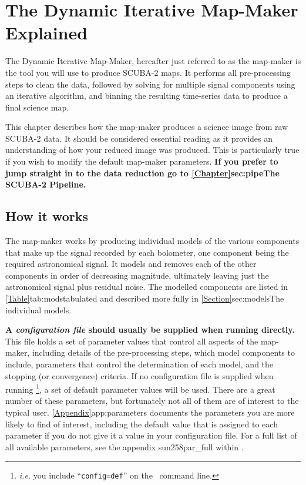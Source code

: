 \chapter{The Dynamic Iterative Map-Maker Explained}
\label{sec:dimm}

The Dynamic Iterative Map-Maker, hereafter just referred to as the
map-maker is the tool you will use to produce SCUBA-2 maps. It performs
all pre-processing steps to clean the data, followed by solving for
multiple signal components using an iterative algorithm, and binning
the resulting time-series data to produce a final science map.

This chapter describes how the map-maker produces a science image
from raw SCUBA-2 data. It should be considered essential reading as it
provides an understanding of how your reduced image was produced. This is
particularly true if you wish to modify the default map-maker parameters.
\color{red}\textbf{ If you prefer to jump straight in to the data reduction go
to \cref{Chapter}{sec:pipe}{The SCUBA-2 Pipeline}.}\color{black}


\section{How it works}

The map-maker works by producing individual models of the various
components that make up the signal recorded by each bolometer, one
component being the required astronomical signal.  It models and removes
each of the other components in order of decreasing magnitude, ultimately
leaving just the astronomical signal plus residual noise.  The modelled
components are listed in \cref{Table}{tab:mods}{tabulated} and described
more fully in \cref{Section}{sec:models}{The individual models}.

\textbf{A \emph{configuration file} should usually be supplied when
running \makemap directly.} This file holds a set of parameter values
that control all aspects of the map-maker, including details of the
pre-processing steps, which model components to include, parameters that
control the determination of each model, and the stopping (or
convergence) criteria. If no configuration file is supplied when running
\makemap\footnote{\emph{i.e.} you include ``\texttt{config=def}'' on the
\makemap\ command line.}, a set of default parameter values will be used.
There are a great number of these parameters, but fortunately not all of
them are of interest to the typical user. \cref{Appendix}{app:parameters}{}
documents the parameters you are more likely to find of interest,
including the default value that is assigned to each parameter if you do
not give it a value in your configuration file.  For a full list of all
available parameters, see the appendix 
{sun258}{par_full} within .

